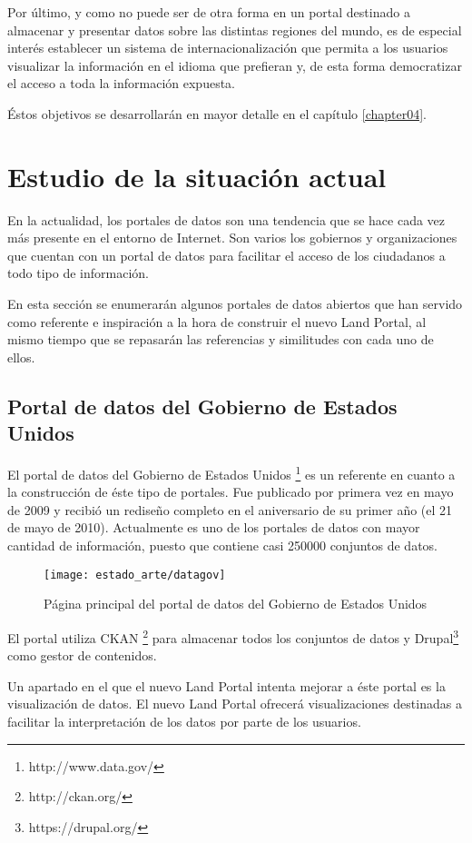 {Por último, y como no puede ser de otra forma en un portal destinado a almacenar y presentar datos sobre las distintas regiones del mundo, es de especial interés establecer un sistema de internacionalización que permita a los usuarios visualizar la información en el idioma que prefieran y, de esta forma democratizar el acceso a toda la información expuesta.

Éstos objetivos se desarrollarán en mayor detalle en el capítulo \ref{chapter04}.



\section{Estudio de la situación actual}
\label{estudio_situacion_actual}
En la actualidad, los portales de datos son una tendencia que se hace cada vez más presente en el entorno de Internet.  Son varios los gobiernos y organizaciones que cuentan con un portal de datos para facilitar el acceso de los ciudadanos a todo tipo de información.

En esta sección se enumerarán algunos portales de datos abiertos que han servido como referente e inspiración a la hora de construir el nuevo Land Portal, al mismo tiempo que se repasarán las referencias y similitudes con cada uno de ellos.

\subsection{Portal de datos del Gobierno de Estados Unidos}
El portal de datos del Gobierno de Estados Unidos \footnote{http://www.data.gov/} es un referente en cuanto a la construcción de éste tipo de portales.  Fue publicado por primera vez en mayo de 2009 y recibió un rediseño completo en el aniversario de su primer año (el 21 de mayo de 2010).  Actualmente es uno de los portales de datos con mayor cantidad de información, puesto que contiene casi 250000 conjuntos de datos.
\begin{figure}[h]
\centering
\texttt{[image: estado\_arte/datagov]}
\caption{Página principal del portal de datos del Gobierno de Estados Unidos}
\end{figure}

El portal utiliza CKAN \footnote{http://ckan.org/} para almacenar todos los conjuntos de datos y Drupal\footnote{https://drupal.org/} como gestor de contenidos.

Un apartado en el que el nuevo Land Portal intenta mejorar a éste portal es la visualización de datos. El nuevo Land Portal ofrecerá visualizaciones destinadas a facilitar la interpretación de los datos por parte de los usuarios.

}
